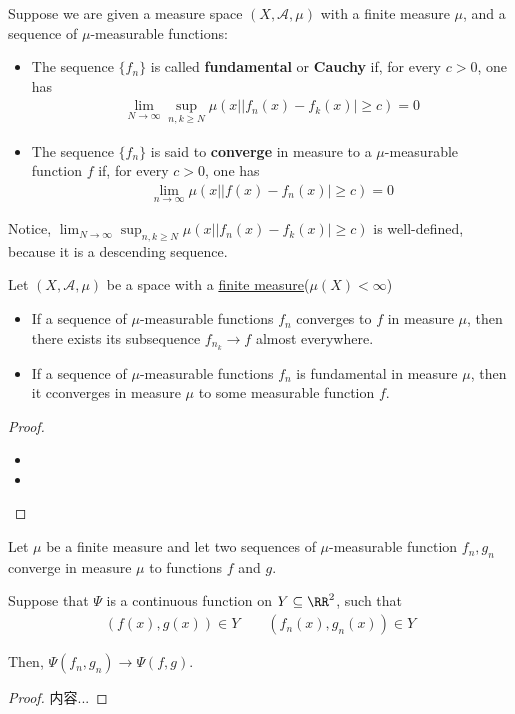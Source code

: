 \documentclass[Total.tex]{subfiles}
\begin{document}
			\begin{Def}
				Suppose we are given a measure space $(X,\mathcal{A},\mu)$ with a finite measure $\mu$, and a sequence of $\mu$-measurable functions:
				\begin{itemize}
					\item The sequence $\{f_n\}$ is called \textbf{fundamental} or \textbf{Cauchy} if, for every $c>0$, one has
					\begin{gather*}
						\lim_{N\rightarrow\infty} \sup_{n,k\geq N} \mu(x||f_n(x)-f_k(x)|\geq c)=0
					\end{gather*}
					\item The sequence $\{f_n\}$ is said to \textbf{converge} in measure to a $\mu$-measurable function $f$ if, for every $c>0$, one has
					\begin{gather*}
						\lim_{n\rightarrow\infty} \mu(x||f(x)-f_n(x)|\geq c)=0
					\end{gather*}
				\end{itemize}
			\end{Def}
			
			Notice, $	\lim_{N\rightarrow\infty} \sup_{n,k\geq N} \mu(x||f_n(x)-f_k(x)|\geq c)$ is well-defined, because it is a descending sequence. 
			
		\begin{proposition}
			Let $(X,\mathcal{A},\mu)$ be a space with a \underline{finite measure}($\mu(X)<\infty$)
			
			\begin{itemize}
				\item If a sequence of $\mu$-measurable functions $f_n$ converges to $f$ in measure $\mu$, then there exists its subsequence $f_{n_k}\rightarrow f$ almost everywhere. 
				\item If a sequence of $\mu$-measurable functions $f_n$ is fundamental in measure $\mu$, then it cconverges in measure $\mu$ to some measurable function $f$. 
			\end{itemize}
		\end{proposition}
		\begin{proof}
			\begin{itemize}
				\item 
				\item 
			\end{itemize}
		\end{proof}
		
		\begin{corollary}
			Let $\mu$ be a finite measure and let two sequences of $\mu$-measurable function $f_n,g_n$ converge in measure $\mu$ to functions $f$ and $g$.
			
			Suppose that $\Psi$ is a continuous function on $Y\subseteq \RR^2$, such that
			\begin{gather*}
				(f(x),g(x))\in Y\qquad (f_n(x),g_n(x))\in Y
			\end{gather*}
			
			Then, $\Psi(f_n,g_n)\rightarrow \Psi(f,g)$.
		\end{corollary}
		\begin{proof}
			内容...
		\end{proof}
		
\end{document}
